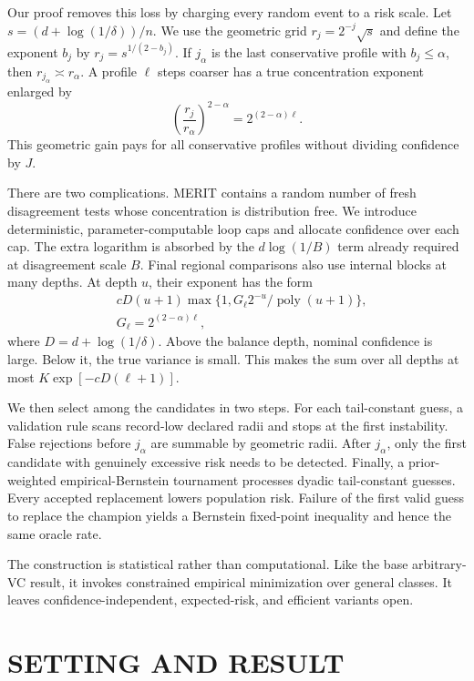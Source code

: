 \documentclass[twoside]{article}
\newcommand{\poly}{\operatorname{poly}}
\begin{document}
Our proof removes this loss by charging every random event to a risk scale. Let $s=(d+\log(1/\delta))/n$. We use the geometric grid $r_j=2^{-j}\sqrt{s}$ and define the exponent $b_j$ by $r_j=s^{1/(2-b_j)}$. If $j_\alpha$ is the last conservative profile with $b_j\leq\alpha$, then $r_{j_\alpha}\asymp r_\alpha$. A profile $\ell$ steps coarser has a true concentration exponent enlarged by \[ \left(\frac{r_j}{r_\alpha}\right)^{2-\alpha} =2^{(2-\alpha)\ell}. \] This geometric gain pays for all conservative profiles without dividing confidence by $J$.

There are two complications. MERIT contains a random number of fresh disagreement tests whose concentration is distribution free. We introduce deterministic, parameter-computable loop caps and allocate confidence over each cap. The extra logarithm is absorbed by the $d\log(1/B)$ term already required at disagreement scale $B$. Final regional comparisons also use internal blocks at many depths. At depth $u$, their exponent has the form
\begin{equation}
 \begin{aligned}
 &cD(u+1)\max\{1,G_\ell 2^{-u}/\poly(u+1)\},\\
 &G_\ell=2^{(2-\alpha)\ell},
 \end{aligned}
 \label{eq:intro-balance}
\end{equation}
where $D=d+\log(1/\delta)$. Above the balance depth, nominal confidence is large. Below it, the true variance is small. This makes the sum over all depths at most $K\exp[-cD(\ell+1)]$.

We then select among the candidates in two steps. For each tail-constant guess, a validation rule scans record-low declared radii and stops at the first instability. False rejections before $j_\alpha$ are summable by geometric radii. After $j_\alpha$, only the first candidate with genuinely excessive risk needs to be detected. Finally, a prior-weighted empirical-Bernstein tournament processes dyadic tail-constant guesses. Every accepted replacement lowers population risk. Failure of the first valid guess to replace the champion yields a Bernstein fixed-point inequality and hence the same oracle rate.

The construction is statistical rather than computational. Like the base arbitrary-VC result, it invokes constrained empirical minimization over general classes. It leaves confidence-independent, expected-risk, and efficient variants open.

\section{SETTING AND RESULT}
\end{document}
